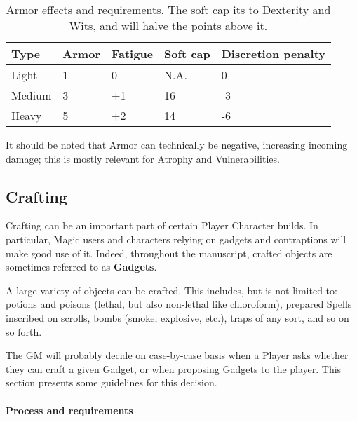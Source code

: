 \begin{table}[h!tbp]
	\begin{center}
		\begin{tabular}{p{1.2cm}p{1.1cm}p{1.3cm}p{1cm}p{1.9cm}} \toprule

			\textbf{Type} & \textbf{Armor} & \textbf{Fatigue} & \textbf{Soft cap} & \textbf{Discretion penalty} \\ \midrule

			Light & 1 & 0 & N.A. & 0\\
			Medium & 3 & +1 & 16 & -3 \\
			Heavy & 5 & +2 & 14 & -6 \\

			\bottomrule
		\end{tabular}
	\end{center}
	\caption{Armor effects and requirements. The soft cap its to Dexterity and Wits, and will halve the points above it.}
	\label{armor_effects}
\end{table}



It should be noted that Armor can technically be negative, increasing incoming damage; this is mostly relevant for Atrophy and Vulnerabilities.


\subsection{Crafting}

Crafting can be an important part of certain Player Character builds. In particular, Magic users and characters relying on gadgets and contraptions will make good use of it. Indeed, throughout the manuscript, crafted objects are sometimes referred to as \textbf{Gadgets}.

A large variety of objects can be crafted. This includes, but is not limited to: potions and poisons (lethal, but also non-lethal like chloroform), prepared Spells inscribed on scrolls, bombs (smoke, explosive, etc.), traps of any sort, and so on so forth.

The GM will probably decide on case-by-case basis when a Player asks whether they can craft a given Gadget, or when proposing Gadgets to the player. This section presents some guidelines for this decision.

\label{crafting}

\paragraph{Process and requirements}

